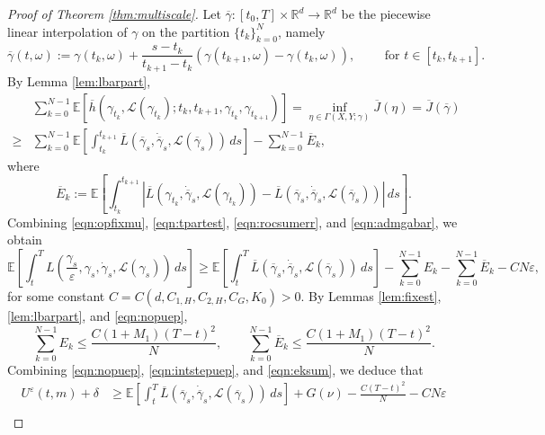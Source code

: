 \documentclass[reqno,11pt]{amsart}
\numberwithin{equation}{section}
\newcommand{\R}{\mathbb{R}} %
\newcommand{\e}{\varepsilon}
\newcommand{\ep}{\varepsilon}
\renewcommand{\bar}{\overline}
\begin{document}
\begin{proof}[Proof of Theorem \ref{thm:multiscale}]
Let $\bar\gamma:[t_0,T] \times \R^d \to \R^d$ be the piecewise linear interpolation of $\gamma$ on the partition $\{t_k\}_{k=0}^N$, namely
\[
\bar{\gamma}(t,\omega):=\gamma(t_k,\omega)+\frac{s-t_k}{t_{k+1}-t_k}\left(\gamma(t_{k+1}, \omega)-\gamma(t_k,\omega)\right), \qquad \text{ for } t \in \left[t_k, t_{k+1}\right].
\]
By Lemma \ref{lem:lbarpart},
\begin{equation}\label{eqn:admgabar}
\begin{aligned}
&\sum_{k=0}^{N-1}
\mathbb{E}\left[\bar{h}\left(\gamma_{t_k}, \mathcal{L}(\gamma_{t_k}); t_k,t_{k+1},
\gamma_{t_k},\gamma_{t_{k+1}}\right)\right]=\inf_{\eta\in \Gamma(X,Y;\gamma)} \bar J(\eta)=\bar{J}(\bar{\gamma})\\
\geq & \sum_{k=0}^{N-1}
\mathbb{E} \left[\int_{t_k}^{t_{k+1}}
\bar{L}\left(\bar{\gamma}_s,
\dot{\bar{\gamma}}_s,
\mathcal{L}\left(\bar{\gamma}_s\right)
\right)\,ds\right]-\sum_{k=0}^{N-1} \bar{E}_k,
\end{aligned}
\end{equation}
where
\[
\bar{E}_k:= \mathbb{E} \left[\int_{t_k}^{t_{k+1}}\left|
\bar{L}\left(\gamma_{t_k},
\dot{\bar{\gamma}}_s,
 \mathcal{L}(\gamma_{t_k})
\right)-
\bar{L}\left(\bar{\gamma}_s,
\dot{\bar{\gamma}}_s,
\mathcal{L}\left(\bar{\gamma}_s\right)
\right)\right|\,ds\right].
\]
Combining \eqref{eqn:opfixmu}, \eqref{eqn:tpartest}, \eqref{eqn:rocsumerr}, and \eqref{eqn:admgabar}, we obtain
\begin{equation}\label{eqn:intstepuep}
    \mathbb{E}\left[\int_{t}^T L\left( \frac{\gamma_s}{\e}, \gamma_s, \dot{\gamma}_s, \mathcal{L}(\gamma_s) \right)\, ds \right] \geq \mathbb{E} \left[\int_t^T
\bar{L}\left(\bar{\gamma}_s,
\dot{\bar{\gamma}}_s,
\mathcal{L}\left(\bar{\gamma}_s\right)
\right)\,ds\right]-\sum_{k=0}^{N-1} E_k -\sum_{k=0}^{N-1} \bar{E}_k -CN \ep,
\end{equation}
for some constant $C=C(d, C_{1,H},C_{2,H},C_G, K_0)>0$.
By Lemmas \ref{lem:fixest}, \ref{lem:lbarpart}, and \eqref{eqn:nopuep},
\begin{equation}\label{eqn:eksum}
\sum_{k=0}^{N-1}E_k \leq  \frac{C(1+M_1)(T-t)^2}{N}, \qquad
\sum_{k=0}^{N-1}\bar{E}_k\leq \frac{C(1+M_1)(T-t)^2}{N}.
\end{equation}Combining \eqref{eqn:nopuep}, \eqref{eqn:intstepuep}, and \eqref{eqn:eksum}, we deduce that
\[
\begin{aligned}
U^\ep(t,m)+\delta & \geq \mathbb{E} \left[\int_t^T
\bar{L}\left(\bar{\gamma}_s,
\dot{\bar{\gamma}}_s,
\mathcal{L}\left(\bar{\gamma}_s\right)
\right)\,ds\right] + G(\nu) -\frac{C(T-t)^2}{N}-CN\ep\\

\end{aligned}\]
\end{proof}
\end{document}
